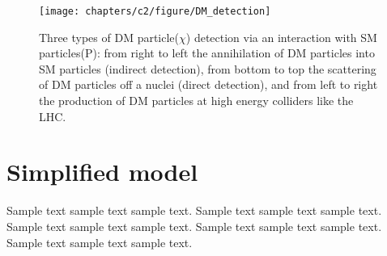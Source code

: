 \begin{figure}[htbp]
  \begin{center}
    \texttt{[image: chapters/c2/figure/DM\_detection]}
  \end{center}
  \caption{ Three types of DM particle($\chi$) detection via an interaction with SM particles(P): from right to left the annihilation of DM particles into SM particles (indirect detection), from bottom to top the scattering of DM particles off a nuclei (direct detection), and from left to right the production of DM particles at high energy colliders like the LHC.}
  \label{fig:detection}
\end{figure}



\section{Simplified model}
Sample text sample text sample text. Sample text sample text sample text.
Sample text sample text sample text. Sample text sample text sample text.
Sample text sample text sample text. \cite{SimplifiedModels-Alves2012}
